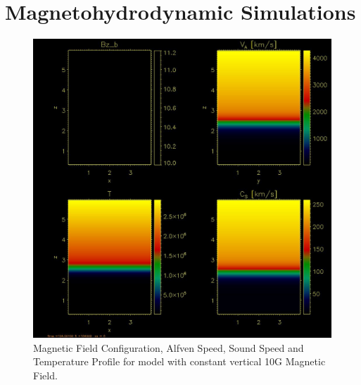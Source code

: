 \documentclass{aa}
\begin{document}

\section{Magnetohydrodynamic Simulations}




\begin{figure}[h]
\includegraphics[scale=0.5]{images/s4b0_b1_4field_3d00000.jpg}
\caption{Magnetic Field Configuration, Alfven Speed, Sound Speed and Temperature Profile for model with constant vertical 10G Magnetic Field. }
\end{figure}



\end{document}
